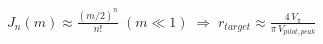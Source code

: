 \documentclass[border=1pt]{standalone}
\begin{document}
\fontsize{14}{16.8}\selectfont
\(\displaystyle J_n(m) \approx \frac{(m/2)^n}{n!}\;(m\ll 1)\;\Longrightarrow\; r_{target} \approx \frac{4\,V_\pi}{\pi\,V_{pilot,peak}}\)
\end{document}
